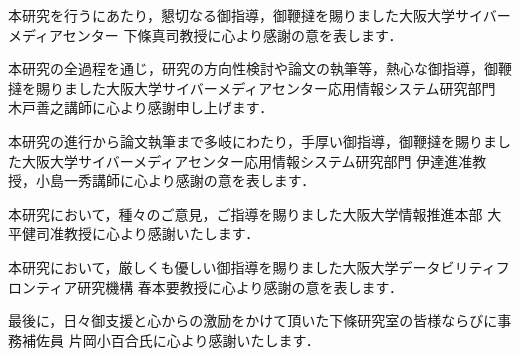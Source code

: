 \acknowledgement
本研究を行うにあたり，懇切なる御指導，御鞭撻を賜りました大阪大学サイバーメディアセンター 下條真司教授に心より感謝の意を表します．

本研究の全過程を通じ，研究の方向性検討や論文の執筆等，熱心な御指導，御鞭撻を賜りました大阪大学サイバーメディアセンター応用情報システム研究部門 木戸善之講師に心より感謝申し上げます．

本研究の進行から論文執筆まで多岐にわたり，手厚い御指導，御鞭撻を賜りました大阪大学サイバーメディアセンター応用情報システム研究部門 伊達進准教授，小島一秀講師に心より感謝の意を表します．

本研究において，種々のご意見，ご指導を賜りました大阪大学情報推進本部 大平健司准教授に心より感謝いたします．

本研究において，厳しくも優しい御指導を賜りました大阪大学データビリティフロンティア研究機構 春本要教授に心より感謝の意を表します．

最後に，日々御支援と心からの激励をかけて頂いた下條研究室の皆様ならびに事務補佐員 片岡小百合氏に心より感謝いたします．
